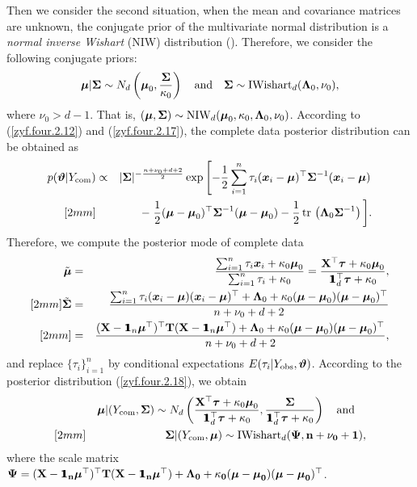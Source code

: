 Then we consider the second situation, when the mean and covariance matrices are unknown, the conjugate prior of the multivariate normal distribution is a \textit{normal inverse Wishart} (NIW) distribution (\cite{LW1992}). Therefore, we consider the following conjugate priors:
\begin{eqnarray}    \label{zyf.four.2.17}
    {\boldsymbol{\mu}} | {\mbox{\boldmath$\Sigma$}} \sim N_d\left( {\boldsymbol{\mu}}_0, \frac{{\mbox{\boldmath$\Sigma$}}}{\kappa_0} \right) \quad \mbox{and} \quad {\mbox{\boldmath$\Sigma$}} \sim \mbox{IWishart}_d({\mbox{\boldmath$\Lambda$}}_0, \nu_0),
\end{eqnarray}
where $\nu_0 > d - 1$. That is, $({\boldsymbol{\mu}}, {\mbox{\boldmath$\Sigma$}}) \sim \mbox{NIW}_d({\boldsymbol{\mu}}_0, \kappa_0, {\mbox{\boldmath$\Lambda$}}_0, \nu_0)$. According to (\ref{zyf.four.2.12}) and (\ref{zyf.four.2.17}), the complete data posterior distribution can be obtained as
\begin{eqnarray}    \label{zyf.four.2.18}
    p(\boldsymbol{\vartheta} | Y_{\rm com}) &\propto& |{\mbox{\boldmath$\Sigma$}}|^{-\frac{n + \nu_0 + d + 2}{2}} \exp\left[ -\frac{1}{2} \sum_{i=1}^n \tau_i ({\boldsymbol{x}}_i - {\boldsymbol{\mu}})^\top {\mbox{\boldmath$\Sigma$}}^{-1} ({\boldsymbol{x}}_i - {\boldsymbol{\mu}}) \right. \nonumber \\ [2mm]
    && -\; \frac{1}{2}({\boldsymbol{\mu}} - {\boldsymbol{\mu}}_0)^\top {\mbox{\boldmath$\Sigma$}}^{-1} ({\boldsymbol{\mu}} - {\boldsymbol{\mu}}_0) - \frac{1}{2}\mbox{$\,$tr$\,$}\left({\mbox{\boldmath$\Lambda$}}_0{\mbox{\boldmath$\Sigma$}}^{-1}\right)\bigg].
\end{eqnarray}
Therefore, we compute the posterior mode of complete data
\begin{eqnarray*}
    \tilde{\bmu} &=& \frac{\sum_{i=1}^n \tau_i \ibx_i + \ka_0\bmu_0}{\sum_{i=1}^n \tau_i + \ka_0} = \frac{\bX^\top \btau + \ka_0\bmu_0}{\1_d^\top \btau + \ka_0}, \\ [2mm]
    \tilde{\bSi} &=& \frac{\sum_{i=1}^n \tau_i (\ibx_i - \bmu)(\ibx_i - \bmu)^\top + \bLa_0 + \ka_0(\bmu - \bmu_0)(\bmu - \bmu_0)^\top}{n + \nu_0 + d + 2} \\ [2mm]
    &=& \frac{(\bX - \1_n \bmu^\top)^\top \bT (\bX - \1_n \bmu^\top) + \bLa_0 + \ka_0(\bmu - \bmu_0)(\bmu - \bmu_0)^\top}{n + \nu_0 + d + 2},
\end{eqnarray*}
and replace $\{\tau_i\}_{i=1}^n$ by conditional expectations $E(\tau_i | Y_{\rm obs}, \boldsymbol{\vartheta})$. According to the posterior distribution (\ref{zyf.four.2.18}), we obtain
\begin{eqnarray}
    && {\boldsymbol{\mu}} | (Y_{\rm com}, {\mbox{\boldmath$\Sigma$}}) \sim N_d\left( \frac{{\bf X}^\top \boldsymbol{\tau} + \kappa_0{\boldsymbol{\mu}}_0}{{\bf 1}\!\!\!{\bf 1}_d^\top \boldsymbol{\tau} + \kappa_0}, \frac{{\mbox{\boldmath$\Sigma$}}}{{\bf 1}\!\!\!{\bf 1}_d^\top\boldsymbol{\tau} + \kappa_0} \right) \quad \mbox{and} \quad \label{zyf.four.2.19} \\ [2mm]
    && {\mbox{\boldmath$\Sigma$}} | (Y_{\rm com}, {\boldsymbol{\mu}}) \sim \mbox{IWishart}_d(\bf{\Psi}, n + \nu_0 + 1), \label{zyf.four.2.20}
\end{eqnarray}
where the scale matrix $\bf{\Psi} = ({\bf X} - {\bf 1}\!\!\!{\bf 1}_n {\boldsymbol{\mu}}^\top)^\top {\bf T} ({\bf X} - {\bf 1}\!\!\!{\bf 1}_n {\boldsymbol{\mu}}^\top) + {\mbox{\boldmath$\Lambda$}}_0 + \kappa_0({\boldsymbol{\mu}} - {\boldsymbol{\mu}}_0)({\boldsymbol{\mu}} - {\boldsymbol{\mu}}_0)^\top$.

